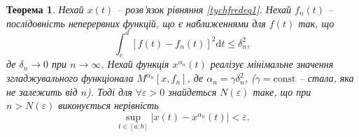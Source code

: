 \documentclass[14pt,twoside]{extreport}
\theoremstyle{mystyle}
\newtheorem{thm}{Теорема}
\numberwithin{equation}{chapter}
\begin{document}
\begin{thm}
	Нехай $x(t)$ -- розв'язок рівняння \eqref{tychfredeq1}. Нехай $f_n(t)$ -- послідовність неперервних функцій, що є наближеннями для $f(t)$ так, що
	$$
	\int_{c}^{d}[f(t)-f_{n}(t)]^{2}\mathrm{d}t \leqslant \delta_{n}^{2},
	$$
	де $\delta_n \to 0$ при $n \to \infty$. Нехай функція $x^{\alpha_n}(t)$ реалізує мінімальне значення згладжувального функціонала $M^{\alpha_n}[x, f_n]$, де $\alpha_n = \gamma \delta_n^2$, ($\gamma = \textrm{const}$ -- стала, яка не залежить від $n$). Тоді для $\forall \varepsilon > 0$ знайдеться $N(\varepsilon)$ таке, що при $n > N(\varepsilon)$ виконується нерівність
	\begin{equation}
		\sup\limits_{t \in [a; b]} |x(t)-x^{\alpha_{n}}(t)|<\varepsilon.
	\end{equation}
\end{thm}
\end{document}
